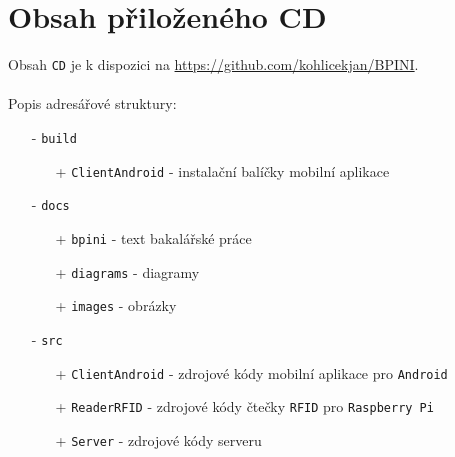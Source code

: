 \documentclass[czech,BP]{thesiskiv}
\begin{document}
\chapter{Obsah přiloženého CD}
Obsah \texttt{CD} je k dispozici na \url{https://github.com/kohlicekjan/BPINI}.
\\\\
Popis adresářové struktury:
\begin{itemize}[noitemsep]
\item [-] \texttt{build}
	\begin{itemize}[noitemsep]
		\item [+] \texttt{ClientAndroid} - instalační balíčky mobilní aplikace
	\end{itemize}
\item [-] \texttt{docs}
	\begin{itemize}[noitemsep]
		\item [+] \texttt{bpini} - text bakalářské práce
		\item [+] \texttt{diagrams} - diagramy
		\item [+] \texttt{images} - obrázky 
	\end{itemize}
\item [-] \texttt{src}
	\begin{itemize}[noitemsep]
		\item [+] \texttt{ClientAndroid} - zdrojové kódy mobilní aplikace pro \texttt{Android}
		\item [+] \texttt{ReaderRFID} - zdrojové kódy čtečky \texttt{RFID} pro \texttt{Raspberry Pi}
		\item [+] \texttt{Server} - zdrojové kódy serveru
	\end{itemize}
\end{itemize}
\end{document}
